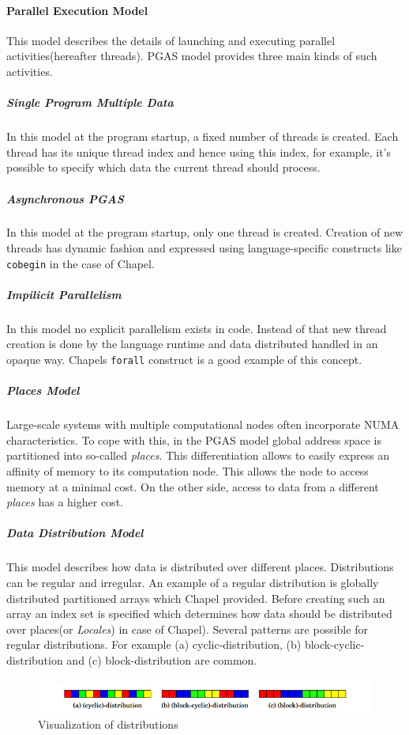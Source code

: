 \documentclass[14pt]{extreport}
\begin{document}
\paragraph{Parallel Execution Model}
This model describes the details of launching and executing parallel activities(hereafter threads). PGAS model provides three main kinds of such activities.

\subparagraph{Single Program Multiple Data}
In this model at the program startup, a fixed number of threads is created. Each thread has its unique thread index and hence using this index, for example, it's possible to specify which data the current thread should process.

\subparagraph{Asynchronous PGAS}
In this model at the program startup, only one thread is created. Creation of new threads has dynamic fashion and expressed using language-specific constructs like \texttt{cobegin} in the case of Chapel.

\subparagraph{Impilicit Parallelism} In this model no explicit parallelism exists in code. Instead of that new thread creation is done by the language runtime and data distributed handled in an opaque way. Chapels \texttt{forall} construct is a good example of this concept.

\subparagraph{Places Model}
Large-scale systems with multiple computational nodes often incorporate NUMA characteristics. To cope with this, in the PGAS model global address space is partitioned into so-called \textit{places}. This differentiation allows to easily express an affinity of memory to its computation node. This allows the node to access memory at a minimal cost. On the other side, access to data from a different \textit{places} has a higher cost.

\subparagraph{Data Distribution Model}\label{DataDistributionModelSubParagraph}
This model describes how data is distributed over different places. Distributions can be regular and irregular. An example of a regular distribution is globally distributed partitioned arrays which Chapel provided. Before creating such an array an index set is specified which determines how data should be distributed over places(or \textit{Locales}) in case of Chapel). Several patterns are possible for regular distributions. For example (a) cyclic-distribution, (b) block-cyclic-distribution and (c) block-distribution are common.

\begin{figure}[H]
	\centering
	\includegraphics[scale=1]{images/distributions.png}
	\caption{Visualization of distributions}
\end{figure}
\end{document}
